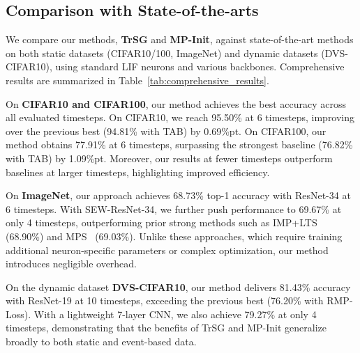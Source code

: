 \subsection{Comparison with State-of-the-arts}

We compare our methods, \textbf{TrSG} and \textbf{MP-Init}, against state-of-the-art methods on both static datasets (CIFAR10/100, ImageNet) and dynamic datasets (DVS-CIFAR10), using standard LIF neurons and various backbones. Comprehensive results are summarized in Table~\ref{tab:comprehensive_results}.

On \textbf{CIFAR10 and CIFAR100}, our method achieves the best accuracy across all evaluated timesteps. On CIFAR10, we reach 95.50\% at 6 timesteps, improving over the previous best (94.81\% with TAB) by 0.69\%pt. On CIFAR100, our method obtains 77.91\% at 6 timesteps, surpassing the strongest baseline (76.82\% with TAB) by 1.09\%pt. Moreover, our results at fewer timesteps outperform baselines at larger timesteps, highlighting improved efficiency.

On \textbf{ImageNet}, our approach achieves 68.73\% top-1 accuracy with ResNet-34 at 6 timesteps. With SEW-ResNet-34, we further push performance to 69.67\% at only 4 timesteps, outperforming prior strong methods such as IMP+LTS~\cite{shen:2024} (68.90\%) and MPS~\cite{ding:2025} (69.03\%). Unlike these approaches, which require training additional neuron-specific parameters or complex optimization, our method introduces negligible overhead.

On the dynamic dataset \textbf{DVS-CIFAR10}, our method delivers 81.43\% accuracy with ResNet-19 at 10 timesteps, exceeding the previous best (76.20\% with RMP-Loss). With a lightweight 7-layer CNN, we also achieve 79.27\% at only 4 timesteps, demonstrating that the benefits of TrSG and MP-Init generalize broadly to both static and event-based data.
